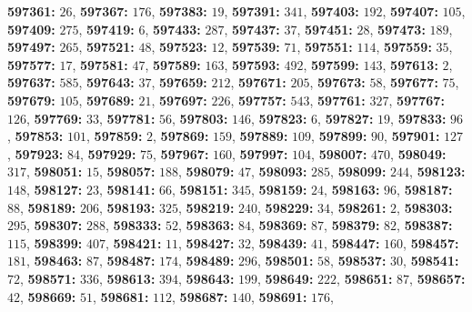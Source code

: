 \textsf{\bfseries 597361:} $26$, \textsf{\bfseries 597367:} $176$, \textsf{\bfseries 597383:} $19$, \textsf{\bfseries 597391:} $341$, \textsf{\bfseries 597403:} $192$, \textsf{\bfseries 597407:} $105$, \textsf{\bfseries 597409:} $275$, \textsf{\bfseries 597419:} $6$, \textsf{\bfseries 597433:} $287$, \textsf{\bfseries 597437:} $37$, \textsf{\bfseries 597451:} $28$, \textsf{\bfseries 597473:} $189$, \textsf{\bfseries 597497:} $265$, \textsf{\bfseries 597521:} $48$, \textsf{\bfseries 597523:} $12$, \textsf{\bfseries 597539:} $71$, \textsf{\bfseries 597551:} $114$, \textsf{\bfseries 597559:} $35$, \textsf{\bfseries 597577:} $17$, \textsf{\bfseries 597581:} $47$, \textsf{\bfseries 597589:} $163$, \textsf{\bfseries 597593:} $492$, \textsf{\bfseries 597599:} $143$, \textsf{\bfseries 597613:} $2$, \textsf{\bfseries 597637:} $585$, \textsf{\bfseries 597643:} $37$, \textsf{\bfseries 597659:} $212$, \textsf{\bfseries 597671:} $205$, \textsf{\bfseries 597673:} $58$, \textsf{\bfseries 597677:} $75$, \textsf{\bfseries 597679:} $105$, \textsf{\bfseries 597689:} $21$, \textsf{\bfseries 597697:} $226$, \textsf{\bfseries 597757:} $543$, \textsf{\bfseries 597761:} $327$, \textsf{\bfseries 597767:} $126$, \textsf{\bfseries 597769:} $33$, \textsf{\bfseries 597781:} $56$, \textsf{\bfseries 597803:} $146$, \textsf{\bfseries 597823:} $6$, \textsf{\bfseries 597827:} $19$, \textsf{\bfseries 597833:} $96$, \textsf{\bfseries 597853:} $101$, \textsf{\bfseries 597859:} $2$, \textsf{\bfseries 597869:} $159$, \textsf{\bfseries 597889:} $109$, \textsf{\bfseries 597899:} $90$, \textsf{\bfseries 597901:} $127$, \textsf{\bfseries 597923:} $84$, \textsf{\bfseries 597929:} $75$, \textsf{\bfseries 597967:} $160$, \textsf{\bfseries 597997:} $104$, \textsf{\bfseries 598007:} $470$, \textsf{\bfseries 598049:} $317$, \textsf{\bfseries 598051:} $15$, \textsf{\bfseries 598057:} $188$, \textsf{\bfseries 598079:} $47$, \textsf{\bfseries 598093:} $285$, \textsf{\bfseries 598099:} $244$, \textsf{\bfseries 598123:} $148$, \textsf{\bfseries 598127:} $23$, \textsf{\bfseries 598141:} $66$, \textsf{\bfseries 598151:} $345$, \textsf{\bfseries 598159:} $24$, \textsf{\bfseries 598163:} $96$, \textsf{\bfseries 598187:} $88$, \textsf{\bfseries 598189:} $206$, \textsf{\bfseries 598193:} $325$, \textsf{\bfseries 598219:} $240$, \textsf{\bfseries 598229:} $34$, \textsf{\bfseries 598261:} $2$, \textsf{\bfseries 598303:} $295$, \textsf{\bfseries 598307:} $288$, \textsf{\bfseries 598333:} $52$, \textsf{\bfseries 598363:} $84$, \textsf{\bfseries 598369:} $87$, \textsf{\bfseries 598379:} $82$, \textsf{\bfseries 598387:} $115$, \textsf{\bfseries 598399:} $407$, \textsf{\bfseries 598421:} $11$, \textsf{\bfseries 598427:} $32$, \textsf{\bfseries 598439:} $41$, \textsf{\bfseries 598447:} $160$, \textsf{\bfseries 598457:} $181$, \textsf{\bfseries 598463:} $87$, \textsf{\bfseries 598487:} $174$, \textsf{\bfseries 598489:} $296$, \textsf{\bfseries 598501:} $58$, \textsf{\bfseries 598537:} $30$, \textsf{\bfseries 598541:} $72$, \textsf{\bfseries 598571:} $336$, \textsf{\bfseries 598613:} $394$, \textsf{\bfseries 598643:} $199$, \textsf{\bfseries 598649:} $222$, \textsf{\bfseries 598651:} $87$, \textsf{\bfseries 598657:} $42$, \textsf{\bfseries 598669:} $51$, \textsf{\bfseries 598681:} $112$, \textsf{\bfseries 598687:} $140$, \textsf{\bfseries 598691:} $176$, 
